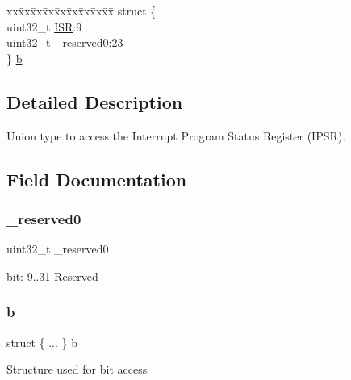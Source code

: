 \begin{DoxyCompactItemize}
\begin{tabbing}
\end{tabbing}\item 
\begin{tabbing}
xx\=xx\=xx\=xx\=xx\=xx\=xx\=xx\=xx\=\kill
struct \{\\
\>uint32\_t \mbox{\hyperlink{union_i_p_s_r___type_ad502ba7dbb2aab5f87c782b28f02622d}{ISR}}:9\\
\>uint32\_t \mbox{\hyperlink{union_i_p_s_r___type_ac8a6a13838a897c8d0b8bc991bbaf7c1}{\_reserved0}}:23\\
\} \mbox{\hyperlink{union_i_p_s_r___type_a0b2f89fc05752fccdf92884a1a81bca9}{b}}\\

\end{tabbing}\end{DoxyCompactItemize}


\subsection{Detailed Description}
Union type to access the Interrupt Program Status Register (I\+P\+SR). 

\subsection{Field Documentation}
\mbox{\label{union_i_p_s_r___type_ac8a6a13838a897c8d0b8bc991bbaf7c1}} 
\subsubsection{\texorpdfstring{\_reserved0}{\_reserved0}}
{\footnotesize\ttfamily uint32\+\_\+t \+\_\+reserved0}

bit\+: 9..31 Reserved \mbox{\label{union_i_p_s_r___type_a0b2f89fc05752fccdf92884a1a81bca9}} 
\subsubsection{\texorpdfstring{b}{b}\hspace{0.1cm}{\footnotesize\ttfamily [1/4]}}
{\footnotesize\ttfamily struct \{ ... \}   b}

Structure used for bit access \mbox{\label{union_i_p_s_r___type_ad36fa78590879fac0e448d2b83be9034}} 
